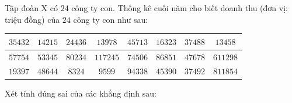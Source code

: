 \begin{ex}
Tập đoàn X có $24$ công ty con. Thống kê cuối năm cho biết doanh thu (đơn vị: triệu đồng) của $24$ công ty con như sau:
\begin{center}
\begin{tabular}{|c|c|c|c|c|c|c|c|}\hline
$35432$ & $14215$ & $24436$ & $13978$ & $45713$ & $16323$ & $37488$ & $13458$\\\hline
$57754$ & $53345$ & $80234$ & $117245$ & $74506$ & $86851$ & $47678$ & $611298$\\\hline
$19397$ & $48644$ & $8324$ & $9599$ & $94338$ & $45390$ & $37492$ & $811854$\\\hline
\end{tabular}
\end{center}
Xét tính đúng sai của các khẳng định sau:
\end{ex}
